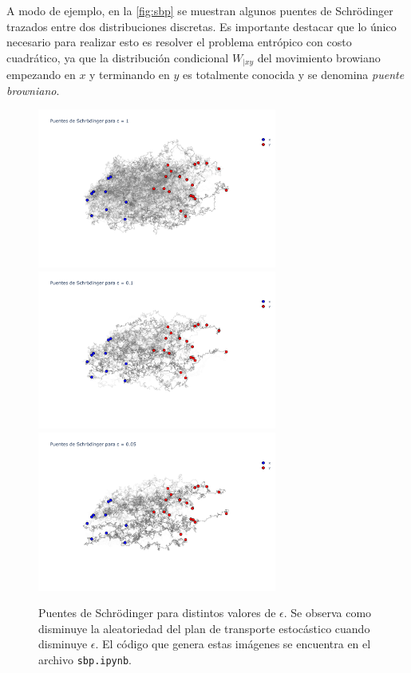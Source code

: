 A modo de ejemplo, en la \autoref{fig:sbp} se muestran algunos puentes de Schrödinger trazados entre dos distribuciones discretas. Es importante destacar que lo único necesario para realizar esto es resolver el problema entrópico con costo cuadrático, ya que la distribución condicional $W_{|xy}$ del movimiento browiano empezando en $x$ y terminando en $y$ es totalmente conocida y se denomina \textit{puente browniano}.

\begin{figure}[!ht]
	\centering
	\includegraphics[width=0.7\textwidth]{images/eot_sbp/sbp_solution1}
	\includegraphics[width=0.7\textwidth]{images/eot_sbp/sbp_solution0.1}
	\includegraphics[width=0.7\textwidth]{images/eot_sbp/sbp_solution0.05}
	\caption{Puentes de Schrödinger para distintos valores de $\epsilon$. Se observa como disminuye la aleatoriedad del plan de transporte estocástico cuando disminuye $\epsilon$. El código que genera estas imágenes se encuentra en el archivo \texttt{sbp.ipynb}.}
	\label{fig:sbp}
\end{figure}


